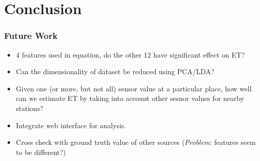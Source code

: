 \section{Conclusion}
\begin{frame}
\frametitle{Future Work}
\begin{itemize}
\setlength\itemsep{1em}
\item 4 features used in equation, do the other 12 have significant effect on ET?
\item Can the dimensionality of dataset be reduced using PCA/LDA?
\item Given one (or more, but not all) sensor value at a particular place, how well can we estimate ET by taking into account other sesnor values for nearby stations?
\item Integrate web interface for analysis.
\item Cross check with ground truth value of other sources (\textit{Problem:} features seem to be different?)
\end{itemize}
\end{frame}
